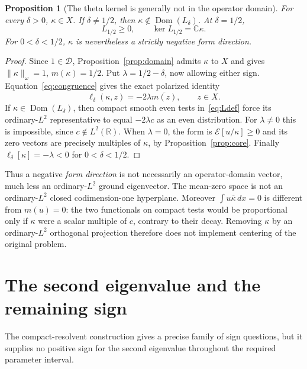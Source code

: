 \documentclass[11pt,a4paper]{article}
\numberwithin{equation}{section}
\newtheorem{proposition}[theorem]{Proposition}
\theoremstyle{definition}
\theoremstyle{remark}
\newcommand{\R}{\mathbb R}
\newcommand{\C}{\mathbb C}
\newcommand{\E}{\mathcal E}
\newcommand{\D}{\mathcal D}
\newcommand{\dom}{\operatorname{Dom}}
\newcommand{\norm}[1]{\lVert #1\rVert}
\begin{document}
\begin{proposition}[The theta kernel is generally not in the operator domain]\label{prop:kdomain}
For every $\delta>0$, $\kappa\in X$. If $\delta\ne1/2$, then $\kappa\notin\dom(L_\delta)$. At $\delta=1/2$,
\begin{equation}\label{eq:halfkernel}
 L_{1/2}\ge0,\qquad \ker L_{1/2}=\C\kappa.
\end{equation}
For $0<\delta<1/2$, $\kappa$ is nevertheless a strictly negative form direction.
\end{proposition}
\begin{proof}
Since $1\in\D$, Proposition~\ref{prop:domain} admits $\kappa$ to $X$ and gives $\norm{\kappa}_\omega=1$, $m(\kappa)=1/2$. Put $\lambda=1/2-\delta$, now allowing either sign. Equation~\eqref{eq:congruence} gives the exact polarized identity
\begin{equation}\label{eq:sourcerow}
 \ell_\delta(\kappa,z)=-2\lambda\overline{m(z)},\qquad z\in X.
\end{equation}
If $\kappa\in\dom(L_\delta)$, then compact smooth even tests in~\eqref{eq:Ldef} force its ordinary-$L^2$ representative to equal $-2\lambda c$ as an even distribution. For $\lambda\ne0$ this is impossible, since $c\notin L^2(\R)$. When $\lambda=0$, the form is $\E[u/\kappa]\ge0$ and its zero vectors are precisely multiples of $\kappa$, by Proposition~\ref{prop:core}. Finally $\ell_\delta[\kappa]=-\lambda<0$ for $0<\delta<1/2$.
\end{proof}

Thus a negative \emph{form direction} is not necessarily an operator-domain vector, much less an ordinary-$L^2$ ground eigenvector. The mean-zero space is not an ordinary-$L^2$ closed codimension-one hyperplane. Moreover $\int u\overline\kappa\,dx=0$ is different from $m(u)=0$: the two functionals on compact tests would be proportional only if $\kappa$ were a scalar multiple of $c$, contrary to their decay. Removing $\kappa$ by an ordinary-$L^2$ orthogonal projection therefore does not implement centering of the original problem.

\section{The second eigenvalue and the remaining sign}\label{sec:sign}

The compact-resolvent construction gives a precise family of sign questions, but it supplies no positive sign for the second eigenvalue throughout the required parameter interval.
\end{document}
